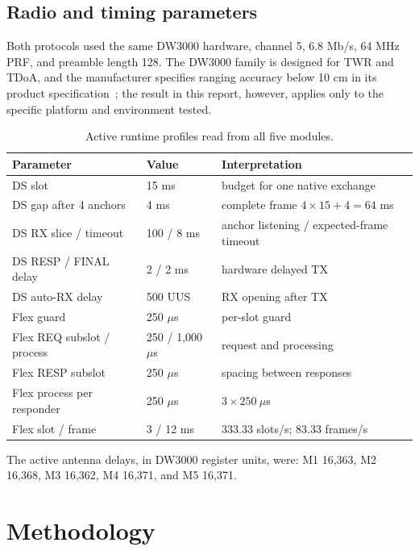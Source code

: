 \documentclass[11pt,a4paper]{article}
\begin{document}
\subsection{Radio and timing parameters}

Both protocols used the same DW3000 hardware, channel 5, 6.8 Mb/s, 64 MHz PRF,
and preamble length 128. The DW3000 family is designed for TWR and TDoA, and
the manufacturer specifies ranging accuracy below 10 cm in its product
specification~\cite{qorvo-product,dwm3000-datasheet}; the result in this report,
however, applies only to the specific platform and environment tested.

\begin{table}[H]
  \centering
  \caption{Active runtime profiles read from all five modules.}
  \small
  \begin{tabularx}{\textwidth}{lR{25mm}Y}
    \toprule
    Parameter & Value & Interpretation\\
    \midrule
    DS slot & 15 ms & budget for one native exchange\\
    DS gap after 4 anchors & 4 ms & complete frame $4\times15+4=64$ ms\\
    DS RX slice / timeout & 100 / 8 ms & anchor listening / expected-frame timeout\\
    DS RESP / FINAL delay & 2 / 2 ms & hardware delayed TX\\
    DS auto-RX delay & 500 UUS & RX opening after TX\\
    \midrule
    Flex guard & 250 $\mu$s & per-slot guard\\
    Flex REQ subslot / process & 250 / 1,000 $\mu$s & request and processing\\
    Flex RESP subslot & 250 $\mu$s & spacing between responses\\
    Flex process per responder & 250 $\mu$s & $3\times250\ \mu$s\\
    Flex slot / frame & 3 / 12 ms & 333.33 slots/s; 83.33 frames/s\\
    \bottomrule
  \end{tabularx}
\end{table}

The active antenna delays, in DW3000 register units, were: M1 16,363,
M2 16,368, M3 16,362, M4 16,371, and M5 16,371.

\section{Methodology}
\end{document}
